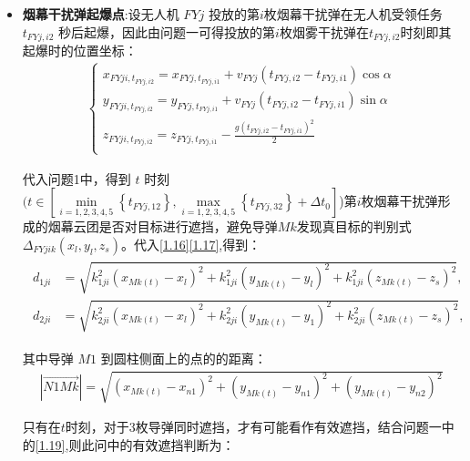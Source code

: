 \documentclass[../main.tex]{subfiles}
\begin{document}
\begin{itemize}
\item \textbf{烟幕干扰弹起爆点}:设无人机 $FYj$ 投放的第$i$枚烟幕干扰弹在无人机受领任务 \( t_{FYj,i2} \) 秒后起爆，因此由问题一可得投放的第$i$枚烟雾干扰弹在$t_{FYj,i2}$时刻即其起爆时的位置坐标：
\begin{align}\label{19.4}
\left\{ \begin{array}{l}
	x_{FYji,t_{FYj,i2}}=x_{FYj,t_{FYj,i1}}+v_{FYj}\left( t_{FYj,i2}-t_{FYj,i1} \right) \cos \alpha\\
	y_{FYji,t_{FYj,i2}}=y_{FYj,t_{FYj,i1}}+v_{FYj}\left( t_{FYj,i2}-t_{FYj,i1} \right) \sin \alpha\\
	z_{FYji,t_{FYj,i2}}=z_{FYj,t_{FYj,i1}}-\frac{g\left( t_{FYj,i2}-t_{FYj,i1} \right) ^2}{2}\\
\end{array} \right. 
\end{align}
\par 代入问题1中，得到 $t$ 时刻$(t\in \left[ \underset{i=1,2,3,4,5}{\min}\left\{ t_{FYj,12} \right\} ,\underset{i=1,2,3,4,5}{\max}\left\{ t_{FYj,32} \right\} +\Delta t_0 \right]$)第$i$枚烟幕干扰弹形成的烟幕云团是否对目标进行遮挡，避免导弹$Mk$发现真目标的判别式$\Delta _{FYjik}\left( x_l,y_l,z_s \right) $。代入\eqref{1.16}\eqref{1.17},得到：
\begin{align}\label{1.1714}
	\begin{aligned}
d_{1ji} &= \sqrt{k_{1ji}^2(x_{Mk(t)} - x_l)^2 + k_{1ji}^2(y_{Mk(t)} - y_l)^2 + k_{1ji}^2(z_{Mk(t)} - z_s)^2}, \\
d_{2ji} &= \sqrt{k_{2ji}^2(x_{Mk(t)} - x_l)^2 + k_{2ji}^2(y_{Mk(t)} - y_1)^2 + k_{2ji}^2(z_{Mk(t)} - z_s)^2},
\end{aligned}
\end{align}
\par 其中导弹 \( M1 \) 到圆柱侧面上的点的的距离：
\begin{align}\label{1.182}
	\left| \overrightarrow{N1Mk} \right|=\sqrt{\left( x_{Mk(t)}-x_{n1} \right) ^2+\left( y_{Mk(t)}-y_{n1} \right) ^2+\left( y_{Mk(t)}-y_{n2} \right) ^2}
\end{align}












只有在$t$时刻，对于3枚导弹同时遮挡，才有可能看作有效遮挡，结合问题一中的\eqref{1.19},则此问中的有效遮挡判断为：



\end{itemize}
\end{document}
